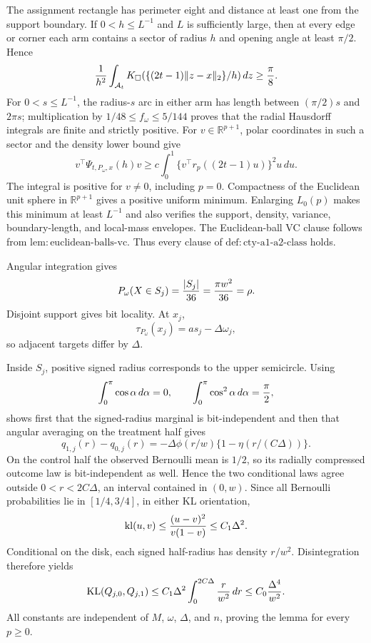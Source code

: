 The assignment rectangle has perimeter eight and distance at least one from the support boundary.  If \(0<h\leq L^{-1}\) and \(L\) is sufficiently large, then at every edge or corner each arm contains a sector of radius \(h\) and opening angle at least \(\pi/2\).  Hence
\[
 {1\over h^2}\int_{\mathcal A_t}
 K_\square(\{(2t-1)\|z-x\|_2\}/h)\,dz\geq{\pi\over8}.
\]
For \(0<s\leq L^{-1}\), the radius-\(s\) arc in either arm has length between \((\pi/2)s\) and \(2\pi s\); multiplication by \(1/48\leq f_\omega\leq5/144\) proves that the radial Hausdorff integrals are finite and strictly positive.  For \(v\in\mathbb R^{p+1}\), polar coordinates in such a sector and the density lower bound give
\[
 v^\top\Psi_{t,P_\omega,x}(h)v
 \geq c\int_0^1\{v^\top r_p((2t-1)u)\}^2u\,du.
\]
The integral is positive for \(v\ne0\), including \(p=0\).  Compactness of the Euclidean unit sphere in \(\mathbb R^{p+1}\) gives a positive uniform minimum.  Enlarging \(L_0(p)\) makes this minimum at least \(L^{-1}\) and also verifies the support, density, variance, boundary-length, and local-mass envelopes.  The Euclidean-ball VC clause follows from \(\mathrm{lem:euclidean\text{-}balls\text{-}vc}\).  Thus every clause of \(\mathrm{def:cty\text{-}a1\text{-}a2\text{-}class}\) holds.

Angular integration gives
\[
 P_\omega(X\in S_j)={|S_j|\over36}={\pi w^2\over36}=\rho.
\]
Disjoint support gives bit locality.  At \(x_j\),
\[
 \tau_{P_\omega}(x_j)=as_j-\Delta\omega_j,
\]
so adjacent targets differ by \(\Delta\).

Inside \(S_j\), positive signed radius corresponds to the upper semicircle.  Using
\[
 \int_0^\pi\cos\alpha\,d\alpha=0,
 \qquad \int_0^\pi\cos^2\alpha\,d\alpha={\pi\over2},
\]
shows first that the signed-radius marginal is bit-independent and then that angular averaging on the treatment half gives
\[
 q_{1,j}(r)-q_{0,j}(r)
 =-\Delta\phi(r/w)\{1-\eta(r/(C\Delta))\}.
\]
On the control half the observed Bernoulli mean is \(1/2\), so its radially compressed outcome law is bit-independent as well.  Hence the two conditional laws agree outside \(0<r<2C\Delta\), an interval contained in \((0,w)\).  Since all Bernoulli probabilities lie in \([1/4,3/4]\), in either KL orientation,
\[
 \operatorname{kl}(u,v)\leq{(u-v)^2\over v(1-v)}
 \leq C_1\Delta^2.
\]
Conditional on the disk, each signed half-radius has density \(r/w^2\).  Disintegration therefore yields
\[
 \operatorname{KL}(Q_{j,0},Q_{j,1})
 \leq C_1\Delta^2\int_0^{2C\Delta}{r\over w^2}\,dr
 \leq C_0{\Delta^4\over w^2}.
\]
All constants are independent of \(M\), \(\omega\), \(\Delta\), and \(n\), proving the lemma for every \(p\geq0\).